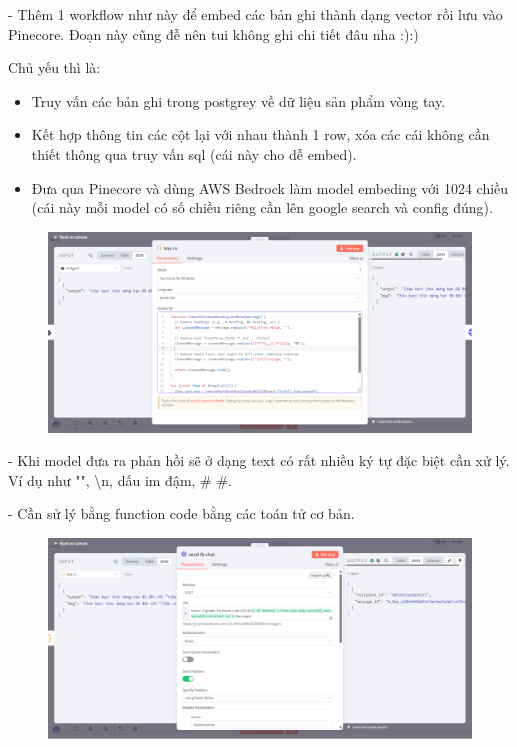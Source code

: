 - Thêm 1 workflow như này để embed các bản ghi thành dạng vector rồi lưu vào Pinecore. Đoạn này cũng đễ nên tui không ghi chi tiết đâu nha :):)

Chủ yếu thì là:


\begin{itemize}
    \item Truy vấn các bản ghi trong postgrey về dữ liệu sản phẩm vòng tay.
    \item Kết hợp thông tin các cột lại với nhau thành 1 row, xóa các cái không cần thiết thông qua truy vấn sql (cái này cho dễ embed).
    \item Đưa qua Pinecore và dùng AWS Bedrock làm model embeding với 1024 chiều (cái này mỗi model có số chiều riêng cần lên google search và config đúng). 
\end{itemize}

\begin{figure}[htbp]
    \centering
    \includegraphics[width=1\linewidth]{Chap1-7/code-function-cleand.pdf}
\end{figure}
- Khi model đưa ra phản hồi sẽ ở dạng text có rất nhiều ký tự đặc biệt cần xử lý. Ví dụ như "", \textbackslash n, dấu im đậm, \# \#.

\newpage

- Cần sử lý bằng function code bằng các toán tử cơ bản.

\begin{figure}[htbp]
    \centering
    \includegraphics[width=1\linewidth]{Chap1-7/send-fb.pdf}
\end{figure}

